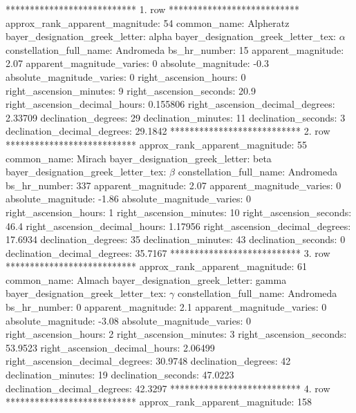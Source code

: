 *************************** 1. row ***************************
    approx_rank_apparent_magnitude: 54
                       common_name: Alpheratz
    bayer_designation_greek_letter: alpha
bayer_designation_greek_letter_tex: $\alpha$
           constellation_full_name: Andromeda
                      bs_hr_number: 15
                apparent_magnitude: 2.07
         apparent_magnitude_varies: 0
                absolute_magnitude: -0.3
         absolute_magnitude_varies: 0
             right_ascension_hours: 0
           right_ascension_minutes: 9
           right_ascension_seconds: 20.9
     right_ascension_decimal_hours: 0.155806
   right_ascension_decimal_degrees: 2.33709
               declination_degrees: 29
               declination_minutes: 11
               declination_seconds: 3
       declination_decimal_degrees: 29.1842
*************************** 2. row ***************************
    approx_rank_apparent_magnitude: 55
                       common_name: Mirach
    bayer_designation_greek_letter: beta
bayer_designation_greek_letter_tex: $\beta$
           constellation_full_name: Andromeda
                      bs_hr_number: 337
                apparent_magnitude: 2.07
         apparent_magnitude_varies: 0
                absolute_magnitude: -1.86
         absolute_magnitude_varies: 0
             right_ascension_hours: 1
           right_ascension_minutes: 10
           right_ascension_seconds: 46.4
     right_ascension_decimal_hours: 1.17956
   right_ascension_decimal_degrees: 17.6934
               declination_degrees: 35
               declination_minutes: 43
               declination_seconds: 0
       declination_decimal_degrees: 35.7167
*************************** 3. row ***************************
    approx_rank_apparent_magnitude: 61
                       common_name: Almach
    bayer_designation_greek_letter: gamma
bayer_designation_greek_letter_tex: $\gamma$
           constellation_full_name: Andromeda
                      bs_hr_number: 0
                apparent_magnitude: 2.1
         apparent_magnitude_varies: 0
                absolute_magnitude: -3.08
         absolute_magnitude_varies: 0
             right_ascension_hours: 2
           right_ascension_minutes: 3
           right_ascension_seconds: 53.9523
     right_ascension_decimal_hours: 2.06499
   right_ascension_decimal_degrees: 30.9748
               declination_degrees: 42
               declination_minutes: 19
               declination_seconds: 47.0223
       declination_decimal_degrees: 42.3297
*************************** 4. row ***************************
    approx_rank_apparent_magnitude: 158
